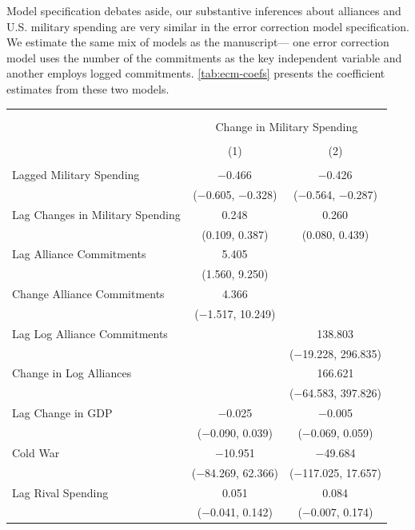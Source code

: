 \documentclass[12pt]{article}
\begin{document}
Model specification debates aside, our substantive inferences about alliances and U.S. military spending are very similar in the error correction model specification.
We estimate the same mix of models as the manuscript--- one error correction model uses the number of the commitments as the key independent variable and another employs logged commitments. 
\autoref{tab:ecm-coefs} presents the coefficient estimates from these two models. 


\begin{table}[!htbp] \centering  
\begin{adjustbox}{width= .95\textwidth, center}
\begin{tabular}{@{\extracolsep{5pt}}lcc} 
\\[-1.8ex]\hline \\[-1.8ex] 
\\[-1.8ex] & \multicolumn{2}{c}{Change in Military Spending} \\ 
\\[-1.8ex] & (1) & (2)\\ 
\hline \\[-1.8ex] 
 Lagged Military Spending & $-$0.466$^{}$ & $-$0.426$^{}$ \\ 
  & ($-$0.605, $-$0.328) & ($-$0.564, $-$0.287) \\ 
  Lag Changes in Military Spending & 0.248$^{}$ & 0.260$^{}$ \\ 
  & (0.109, 0.387) & (0.080, 0.439) \\ 
  Lag Alliance Commitments & 5.405$^{}$ &  \\ 
  & (1.560, 9.250) &  \\ 
  Change Alliance Commitments & 4.366 &  \\ 
  & ($-$1.517, 10.249) &  \\ 
  Lag Log Alliance Commitments &  & 138.803$^{}$ \\ 
  &  & ($-$19.228, 296.835) \\ 
  Change in Log Alliances &  & 166.621 \\ 
  &  & ($-$64.583, 397.826) \\ 
  Lag Change in GDP & $-$0.025 & $-$0.005 \\ 
  & ($-$0.090, 0.039) & ($-$0.069, 0.059) \\ 
  Cold War & $-$10.951 & $-$49.684 \\ 
  & ($-$84.269, 62.366) & ($-$117.025, 17.657) \\ 
  Lag Rival Spending & 0.051 & 0.084$^{}$ \\ 
  & ($-$0.041, 0.142) & ($-$0.007, 0.174) \\ 

\end{tabular}
\end{adjustbox}
\end{table}
\end{document}
